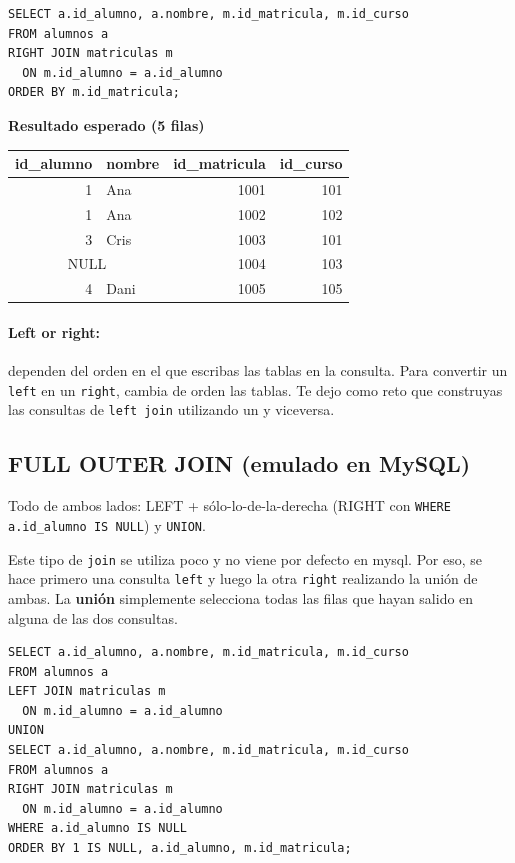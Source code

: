\documentclass[11pt,a4paper]{article}
\begin{document}
\begin{lstlisting}
SELECT a.id_alumno, a.nombre, m.id_matricula, m.id_curso
FROM alumnos a
RIGHT JOIN matriculas m
  ON m.id_alumno = a.id_alumno
ORDER BY m.id_matricula;
\end{lstlisting}

\textbf{Resultado esperado (5 filas)}
\begin{center}
\begin{tabular}{r l r r}
\toprule
id\_alumno & nombre & id\_matricula & id\_curso \\
\midrule
1   & Ana  & 1001 & 101 \\
1   & Ana  & 1002 & 102 \\
3   & Cris & 1003 & 101 \\
\multicolumn{2}{c}{NULL} & 1004 & 103 \\
4   & Dani & 1005 & 105 \\
\bottomrule
\end{tabular}
\end{center}

\paragraph{Left or right:} dependen del orden en el que escribas las tablas en la consulta. Para convertir un \texttt{left} en un \texttt{right}, cambia de orden las tablas.
%
Te dejo como reto que construyas las consultas de \texttt{left join} utilizando un  y viceversa.

\subsection{FULL OUTER JOIN (emulado en MySQL)}
\begin{tcolorbox}[title=Idea]
Todo de ambos lados: LEFT +
sólo-lo-de-la-derecha (RIGHT con \texttt{WHERE a.id\_alumno IS NULL}) y \texttt{UNION}.
\end{tcolorbox}

Este tipo de \texttt{join} se utiliza poco y no viene por defecto en mysql. Por eso, se hace primero una consulta \texttt{left} y luego la otra \texttt{right} realizando la unión de ambas. 
%
La \textbf{unión} simplemente selecciona todas las filas que hayan salido en alguna de las dos consultas.

\begin{lstlisting}
SELECT a.id_alumno, a.nombre, m.id_matricula, m.id_curso
FROM alumnos a
LEFT JOIN matriculas m
  ON m.id_alumno = a.id_alumno
UNION
SELECT a.id_alumno, a.nombre, m.id_matricula, m.id_curso
FROM alumnos a
RIGHT JOIN matriculas m
  ON m.id_alumno = a.id_alumno
WHERE a.id_alumno IS NULL
ORDER BY 1 IS NULL, a.id_alumno, m.id_matricula;
\end{lstlisting}
\end{document}
